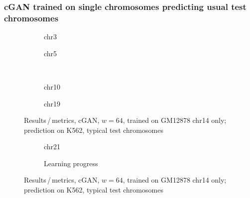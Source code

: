 \subsubsection[cGAN trained on single chromosomes]{cGAN trained on single chromosomes predicting usual test chromosomes}
\begin{figure}[h!] %
    \begin{subfigure}{0.45\textwidth}
        \scriptsize
        \caption{chr3}
    \end{subfigure} \hfill
    \begin{subfigure}{0.45\textwidth}
        \scriptsize
        \caption{chr5}
    \end{subfigure}\\[5mm]
    \begin{subfigure}{0.45\textwidth}
        \scriptsize
        \caption{chr10}
    \end{subfigure}\hfill
    \begin{subfigure}{0.45\textwidth}
        \scriptsize
        \caption{chr19}
    \end{subfigure}
    \caption{Results\,/\,metrics, cGAN, $w=64$, trained on GM12878 chr14 only; prediction on K562, typical test chromosomes}
    \end{figure}
    \begin{figure}\ContinuedFloat
     \centering
    \begin{subfigure}{0.45\textwidth}
        \scriptsize
        \caption{chr21}
    \end{subfigure} \hfill
    \begin{subfigure}{0.45\textwidth}
        \scriptsize
        \caption{Learning progress} \label{fig:appendix:GAN64-14single_lossEpochs}
    \end{subfigure}
    \caption{Results\,/\,metrics, cGAN, $w=64$, trained on GM12878 chr14 only; prediction on K562, typical test chromosomes}   \label{fig:appendix:GAN64-14single_pearson}
\end{figure}
